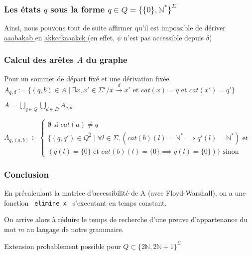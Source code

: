 \documentclass[12pt]{beamer}
\begin{document}
\begin{frame}\frametitle{Les états $q$ sous la forme $q \in Q = \{\{0\},\mathbb{N}^*\}^{\Sigma}$}


Ainsi, nous pouvons tout de suite affirmer qu'il est impossible de dériver \underline{ aaabakab } en \underline{ akkcckaaakck } (en effet, $\psi$ n'est pas accessible depuis $\delta$)

\end{frame}

\begin{frame}\frametitle{Calcul des arêtes $A$ du graphe}
Pour un sommet de départ fixé et une dérivation fixée.
$A_{q,d} := \{(q,b) \in A \mid \exists x,x' \in \Sigma^\star / x \overset{d}{\rightarrow} x' \text{ et } cat(x) = q \text{ et } cat(x') = q'\}$

$A = \bigcup_{q \in Q}  \bigcup_{d \in D} A_{q,d}$

$
A_{q,(a,b)} \subset
\begin{cases}
\emptyset \text{ si } cat(a) \neq q\\
\{ (q,q') \in Q^2 \mid \forall l \in \Sigma,
    (cat(b)(l)=\mathbb{N}^* \implies q'(l)=\mathbb{N}^*) \text{ et }\\
    (q(l)=\{0\} \text{ et } cat(b)(l) = \{0\} \implies q(l)=\{0\}) 
\}
\text{ sinon}
\end{cases}
$

\end{frame}

\begin{frame}\frametitle{Conclusion}
En précalculant la matrice d'accessibilité de A (avec Floyd-Warshall), on a une fonction \texttt{ elimine x } s'executant en temps constant.

On arrive alors à réduire le temps de recherche d'une preuve d'appartenance du mot $m$ au langage de notre grammaire.

Extension probablement possible pour $Q \subset \{2 \mathbb{N} , 2 \mathbb{N} + 1 \}^\Sigma$
\end{frame}
\end{document}
